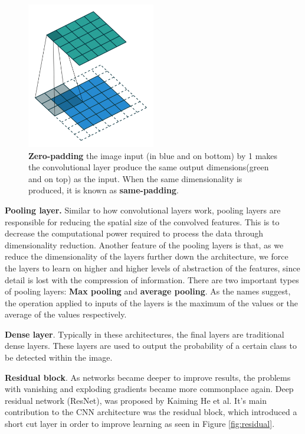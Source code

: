 \documentclass[english, bibtex]{kththesis}
\begin{document}
\begin{figure}[H]
  \begin{center}
    \includegraphics[width=0.5\textwidth]{figures/padding.png}
  \end{center}
  \caption{\textbf{Zero-padding} the image input (in blue and on bottom) by 1 makes the convolutional layer produce the same output dimensions(green and on top) as the input. When the same dimensionality is produced, it is known as \textbf{same-padding}\cite{Kang2020DeepCN}.}
  \label{fig:padding}
\end{figure}

\textbf{Pooling layer.} Similar to how convolutional layers work, pooling layers are responsible for reducing the spatial size of the convolved features. This is to decrease the computational power required to process the data through dimensionality reduction. Another feature of the pooling layers is that, as we reduce the dimensionality of the layers further down the architecture, we force the layers to learn on higher and higher levels of abstraction of the features, since detail is lost with the compression of information. There are two important types of pooling layers: \textbf{Max pooling} and \textbf{average pooling}. As the names suggest, the operation applied to inputs of the layers is the maximum of the values or the average of the values respectively. 

\textbf{Dense layer}. Typically in these architectures, the final layers are traditional dense layers. These layers are used to output the probability of a certain class to be detected within the image. 

\textbf{Residual block}. As networks became deeper to improve results, the problems with vanishing and exploding gradients became more commonplace again. Deep residual network (ResNet), was proposed by Kaiming He et al\cite{he2016deep}. It’s main contribution to the CNN architecture was the residual block, which introduced a short cut layer in order to improve learning as seen in Figure \ref{fig:residual}. 
\end{document}
